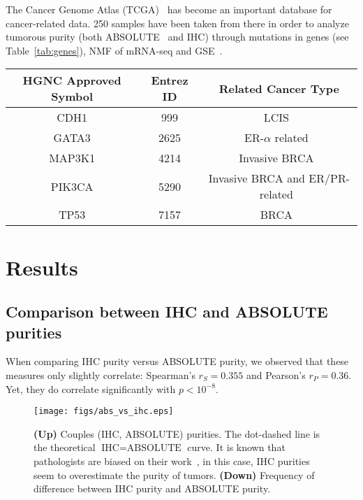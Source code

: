 \documentclass[letterpaper]{article}
\begin{document}
The Cancer Genome Atlas (TCGA)~\citep{weinstein2013cancer} has become an important database for cancer-related data. 250 samples have been taken from there in order to
analyze tumorous purity (both ABSOLUTE~\citep{carter2012absolute} and IHC) through mutations in genes (see Table~\ref{tab:genes}), NMF of mRNA-seq
and GSE~\citep{subramanian2005gene}.

\begin{table*}[!t]
\centering
\vspace{-.5cm}
\begin{tabular}{c|c|c}
HGNC Approved Symbol & Entrez ID & Related Cancer Type \\ \hline \hline
CDH1 & 999 & LCIS~\citep{berx1998mutations} \\ \hline
GATA3 & 2625 & ER-$\alpha$ related~\citep{ciocca2009significance} \\ \hline
MAP3K1 & 4214 & Invasive BRCA~\citep{easton2007genome} \\ \hline
PIK3CA & 5290 & Invasive BRCA and ER/PR-related~\citep{saal2005pik3ca} \\ \hline
TP53 & 7157 & BRCA~\citep{gasco2002p53}
\end{tabular}
\caption{Genes considered in this study with both their HGNC symbol which (used further down) and their Entrez ID.\label{tab:genes}}
\end{table*}

\section{Results}
\subsection{Comparison between IHC and ABSOLUTE purities}
When comparing IHC purity versus ABSOLUTE purity, we observed that these measures only slightly correlate: Spearman's $r_S = 0.355$ and Pearson's $r_P = 0.36$.
Yet, they do correlate significantly with $p < 10^{-8}$.

\begin{figure}[!h]
\hspace{-.6cm}
\texttt{[image: figs/abs\_vs\_ihc.eps]}
\caption{\textbf{(Up)} Couples (IHC, ABSOLUTE) purities. The dot-dashed line is the theoretical $\text{IHC} = \text{ABSOLUTE}$ curve. It is known that pathologists
are biased on their work~\citep{fandel2008we}, in this case, IHC purities seem to overestimate the purity of tumors.
\textbf{(Down)} Frequency of difference between IHC purity and ABSOLUTE purity.\label{fig:abs vs ihc}}
\end{figure}
\end{document}
